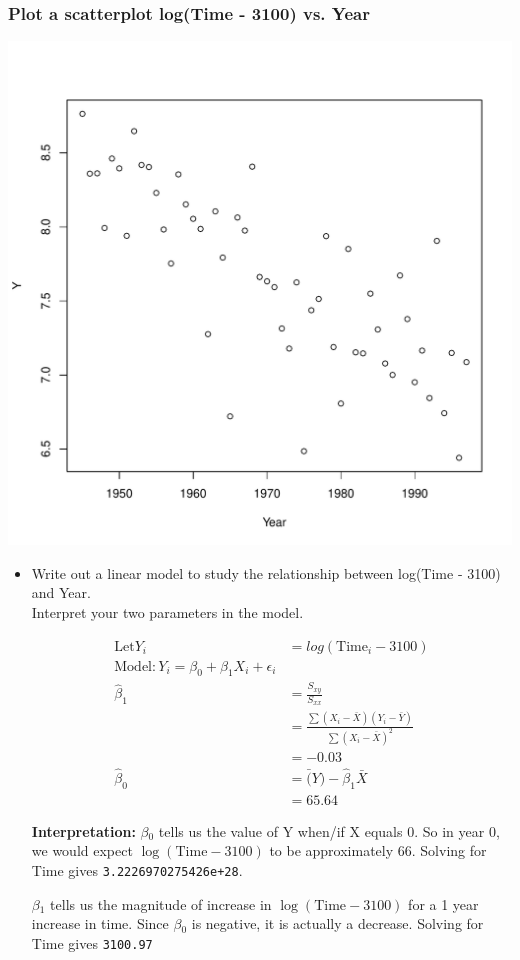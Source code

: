 \documentclass[11pt]{article}
\begin{document}
\subsubsection{Plot a scatterplot log(Time - 3100) vs. Year}
\label{sec-1-3-2}



\includegraphics[width=.9\linewidth]{prob2b.pdf}
\begin{itemize}

\item Write out a linear model to study the relationship between log(Time - 3100) and Year.\\
\label{sec-1-3-2-1}%
Interpret your two parameters in the model.

\begin{align*}
\mathrm{Let} Y_i &= log(\mathrm{Time}_i -3100)\\
\mathrm{Model:} Y_i = \beta_0 + \beta_1 X_i + \epsilon_i\\
\hat{\beta}_1 &= \frac{S_{xy}}{S_{xx}} \\
              &=\frac{ \sum (X_i - \bar{X})(Y_i - \bar{Y})}{\sum (X_i - \bar{X})^2}\\
              &= -0.03\\
\hat{\beta}_{0} &= \bar(Y) - \hat{\beta}_{1}\bar{X}\\
              &= 65.64
\end{align*}

\textbf{Interpretation:} $\beta$$_0$ tells us the value of Y when/if X equals 0.
So in year 0, we would expect $\log(\mathrm{Time} - 3100)$ to be
approximately 66. Solving for Time gives \texttt{3.2226970275426e+28}.

$\beta$$_1$ tells us the magnitude of increase in $\log(\mathrm{Time} -
3100)$ for a 1 year increase in time. Since $\beta$$_0$ is negative, it
is actually a decrease. Solving for Time gives \texttt{3100.97}


\end{itemize} %
\end{document}

